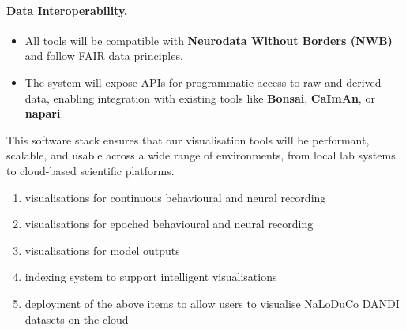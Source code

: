 \paragraph{Data Interoperability.}
\begin{itemize}
          \item All tools will be compatible with \textbf{Neurodata Without
              Borders (NWB)} and follow FAIR data principles.
                \item The system will expose APIs for programmatic access to
                    raw and derived data, enabling integration with existing
                    tools like \textbf{Bonsai}, \textbf{CaImAn}, or
                    \textbf{napari}.
\end{itemize}

This software stack ensures that our visualisation tools will be performant,
scalable, and usable across a wide range of environments, from local lab
systems to cloud-based scientific platforms.


\begin{enumerate}

    \item visualisations for continuous behavioural and neural recording

    \item visualisations for epoched behavioural and neural recording

    \item visualisations for model outputs

    \item indexing system to support intelligent visualisations

    \item deployment of the above items to allow users to visualise NaLoDuCo
        DANDI datasets on the cloud

\end{enumerate}

